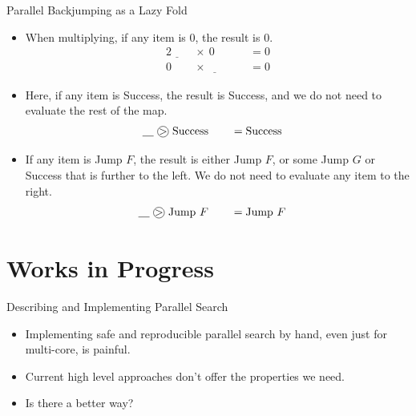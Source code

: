 \documentclass{beamer}
\newcommand*\circled[1]{\tikz[baseline=(char.base)]{
            \node[shape=circle,draw,inner sep=0pt] (char) {#1};}}
\begin{document}
\begin{frame}{Parallel Backjumping as a Lazy Fold}
     {
        \begin{itemize}
            \item When multiplying, if any item is 0, the result is 0.
                \begin{alignat*}{2}
                    \underline{\hspace{1em}} &~\times~ 0 \hspace{1em} &&= 0 \\
                    0 &~\times~ \underline{\hspace{1em}} \hspace{1em} &&= 0
                \end{alignat*}
            \item Here, if any item is Success, the result is Success, and we do not need to evaluate
                the rest of the map.
                \begin{alignat*}{2}
                    \underline{\hspace{1em}} &~\circled{$>$}~ \textnormal{Success} \hspace{1em} &&= \textnormal{Success}
                \end{alignat*}
            \item If any item is Jump $F$, the result is either Jump $F$, or some Jump $G$ or Success
                that is further to the left. We do not need to evaluate any item to the right.
                \begin{alignat*}{2}
                    \underline{\hspace{1em}} &~\circled{$>$}~ \textnormal{Jump}~F \hspace{1em} &&= \textnormal{Jump}~F
                \end{alignat*}
        \end{itemize}
    }

\end{frame}

\section{Works in Progress}

\begin{frame}{Describing and Implementing Parallel Search}

    \begin{itemize}
        \item Implementing safe and reproducible parallel search by hand, even just for multi-core,
            is painful.
        \item Current high level approaches don't offer the properties we need.
        \item Is there a better way?
    \end{itemize}

\end{frame}
\end{document}
